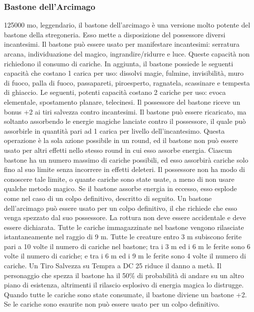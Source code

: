 \begin{multicols}{2}
\subsubsection*{Bastone dell'Arcimago}
125000 mo, leggendario, il bastone dell'arcimago è una versione molto potente del bastone della stregoneria. Esso mette a disposizione del possessore diversi incantesimi. Il bastone può essere usato per manifestare incantesimi: serratura arcana, individuazione del magico, ingrandire/ridurre e luce. Queste capacità non richiedono il consumo di cariche. In aggiunta, il bastone possiede le seguenti capacità che costano 1 carica per uso: dissolvi magie, fulmine, invisibilità, muro di fuoco, palla di fuoco, passapareti, piroesperto, ragnatela, scassinare e tempesta di ghiaccio. Le seguenti, potenti capacità costano 2 cariche per uso: evoca elementale, spostamento planare, telecinesi. Il possessore del bastone riceve un bonus +2 ai tiri salvezza contro incantesimi. Il bastone può essere ricaricato, ma soltanto assorbendo le energie magiche lanciate contro il possessore, il quale può assorbirle in quantità pari ad 1 carica per livello dell'incantesimo. Questa operazione è la sola azione possibile in un round, ed il bastone non può essere usato per altri effetti nello stesso round in cui esso assorbe energia. Ciascun bastone ha un numero massimo di cariche possibili, ed esso assorbirà cariche solo fino al suo limite senza incorrere in effetti deleteri. Il possessore non ha modo di conoscere tale limite, o quante cariche sono state usate, a meno di non usare qualche metodo magico. Se il bastone assorbe energia in eccesso, esso esplode come nel caso di un colpo definitivo, descritto di seguito. Un bastone dell'arcimago può essere usato per un colpo definitivo, il che richiede che esso venga spezzato dal suo possessore. La rottura non deve essere accidentale e deve essere dichiarata. Tutte le cariche immagazzinate nel bastone vengono rilasciate istantaneamente nel raggio di 9 m. Tutte le creature entro 3 m subiscono ferite pari a 10 volte il numero di cariche nel bastone; tra i 3 m ed i 6 m le ferite sono 6 volte il numero di cariche; e tra i 6 m ed i 9 m le ferite sono 4 volte il numero di cariche. Un Tiro Salvezza su Tempra a DC 25 riduce il danno a metà. Il personaggio che spezza il bastone ha il 50\% di probabilità di andare su un altro piano di esistenza, altrimenti il rilascio esplosivo di energia magica lo distrugge. Quando tutte le cariche sono state consumate, il bastone diviene un bastone +2. Se le cariche sono esaurite non può essere usato per un colpo definitivo.


\end{multicols}

